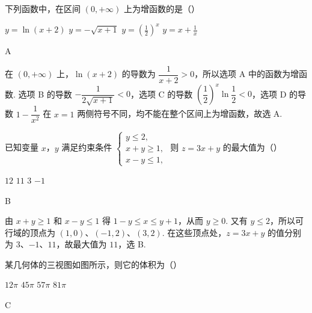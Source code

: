 \begin{problem}
下列函数中，在区间 \((0,+\infty)\) 上为增函数的是（\quad）

\choices
    {\(y = \ln (x + 2)\)}
    {\(y = -\sqrt{x + 1}\)}
    {\(y = \left(\frac{1}{2}\right)^x\)}
    {\(y = x + \frac{1}{x}\)}
\end{problem}

\begin{answer}
A
\end{answer}

\begin{solution}
在 \((0,+\infty)\) 上，\(\ln(x+2)\) 的导数为 \(\dfrac{1}{x+2}>0\)，所以选项 A 中的函数为增函数. 选项 B 的导数 \(-\dfrac{1}{2\sqrt{x+1}}<0\)，选项 C 的导数 \(\left(\dfrac{1}{2}\right)^x\ln\dfrac{1}{2}<0\)，选项 D 的导数 \(1-\dfrac{1}{x^2}\) 在 \(x=1\) 两侧符号不同，均不能在整个区间上为增函数，故选 A.
\end{solution}

\begin{problem}
已知变量 \(x\)，\(y\) 满足约束条件 \(\begin{cases}
y \le 2,\\
x + y \ge 1,\\
x - y \le 1,
\end{cases}\) 则 \(z = 3x + y\) 的最大值为（\quad）

\choices
    {\(12\)}
    {\(11\)}
    {\(3\)}
    {\(-1\)}
\end{problem}

\begin{answer}
B
\end{answer}

\begin{solution}
由 \(x+y\geqslant1\) 和 \(x-y\leqslant1\) 得 \(1-y\leqslant x\leqslant y+1\)，从而 \(y\geqslant0\). 又有 \(y\leqslant2\)，所以可行域的顶点为 \((1,0)\)、\((-1,2)\)、\((3,2)\). 在这些顶点处，\(z=3x+y\) 的值分别为 \(3\)、\(-1\)、\(11\)，故最大值为 \(11\)，选 B.
\end{solution}

\begin{problem}
某几何体的三视图如图所示，则它的体积为（\quad）


\choices
    {\(12\pi\)}
    {\(45\pi\)}
    {\(57\pi\)}
    {\(81\pi\)}
\end{problem}

\begin{answer}
C
\end{answer}

